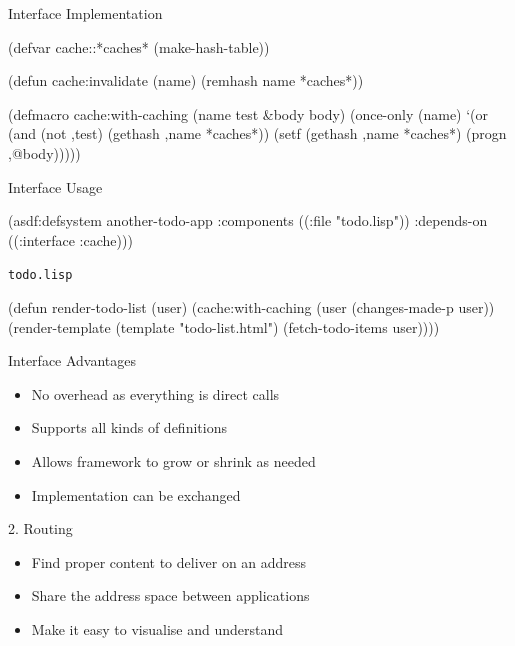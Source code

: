 \documentclass[14pt]{beamer}
\def\code#1{{\color{codecolor}\texttt{#1}}}
\renewcommand{\title}[1]{
  {\huge #1} \vskip 0.4cm
}
\begin{document}
\begin{frame}[fragile]
  \title{Interface Implementation}
\begin{lispcode}
(defvar cache::*caches* (make-hash-table))

(defun cache:invalidate (name)
  (remhash name *caches*))

(defmacro cache:with-caching (name test &body body)
  (once-only (name)
    `(or (and (not ,test) (gethash ,name *caches*))
         (setf (gethash ,name *caches*)
               (progn ,@body)))))
\end{lispcode}
\end{frame}

\begin{frame}[fragile]
  \title{Interface Usage}
\begin{lispcode}
(asdf:defsystem another-todo-app
  :components ((:file "todo.lisp"))
  :depends-on ((:interface :cache)))
\end{lispcode}
  \pause
  \vskip 1cm
  {\footnotesize\code{todo.lisp}}
\begin{lispcode}
(defun render-todo-list (user)
  (cache:with-caching (user (changes-made-p user))
    (render-template (template "todo-list.html")
                     (fetch-todo-items user))))
\end{lispcode}
\end{frame}

\begin{frame}
  \title{Interface Advantages}
  \begin{itemize}
  \item No overhead as everything is direct calls
  \item Supports all kinds of definitions
  \item Allows framework to grow or shrink as needed
  \item Implementation can be exchanged
  \end{itemize}
\end{frame}

\begin{frame}
  \title{2. Routing}
  \begin{itemize}
  \item Find proper content to deliver on an address
  \item Share the address space between applications
  \item Make it easy to visualise and understand
  \end{itemize}
\end{frame}
\end{document}
